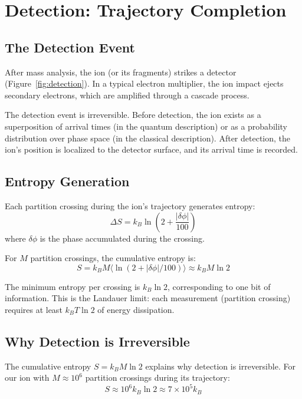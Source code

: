 \documentclass[12pt,a4paper]{article}
\theoremstyle{remark}
\begin{document}
\section{Detection: Trajectory Completion}
\label{sec:detection}

\subsection{The Detection Event}

After mass analysis, the ion (or its fragments) strikes a detector (Figure~\ref{fig:detection}). In a typical electron multiplier, the ion impact ejects secondary electrons, which are amplified through a cascade process.

The detection event is irreversible. Before detection, the ion exists as a superposition of arrival times (in the quantum description) or as a probability distribution over phase space (in the classical description). After detection, the ion's position is localized to the detector surface, and its arrival time is recorded.

\subsection{Entropy Generation}

Each partition crossing during the ion's trajectory generates entropy:
\begin{equation}
\Delta S = k_B \ln\left(2 + \frac{|\delta\phi|}{100}\right)
\end{equation}
where $\delta\phi$ is the phase accumulated during the crossing.

For $M$ partition crossings, the cumulative entropy is:
\begin{equation}
S = k_B M \langle \ln(2 + |\delta\phi|/100) \rangle \approx k_B M \ln 2
\end{equation}

The minimum entropy per crossing is $k_B \ln 2$, corresponding to one bit of information. This is the Landauer limit: each measurement (partition crossing) requires at least $k_B T \ln 2$ of energy dissipation.

\subsection{Why Detection is Irreversible}

The cumulative entropy $S = k_B M \ln 2$ explains why detection is irreversible. For our ion with $M \approx 10^6$ partition crossings during its trajectory:
\begin{equation}
S \approx 10^6 k_B \ln 2 \approx 7 \times 10^5 k_B
\end{equation}
\end{document}

